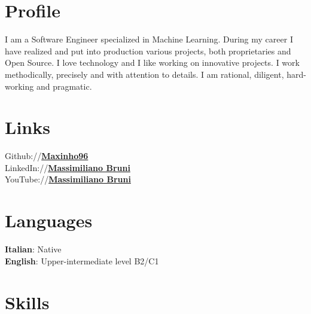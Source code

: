 \documentclass[]{deedy-resume-openfont}
\begin{document}
\begin{minipage}[t]{0.33\textwidth} 


\section{Profile}
I am a Software Engineer specialized in Machine Learning. During my career I have realized and put into production various projects, both proprietaries and Open Source. I love technology and I like working on innovative projects. I work methodically, precisely and with attention to details. I am rational, diligent, hard-working and pragmatic.


\section{Links} 
Github://\href{https://github.com/Maxinho96}{\bf Maxinho96} \\
LinkedIn://\href{https://www.linkedin.com/in/massimiliano-bruni-352926120}{\bf Massimiliano Bruni} \\
YouTube://\href{https://www.youtube.com/channel/UCqskrALDsaUvYC8ztJyqCug}{\bf Massimiliano Bruni}
\sectionsep


\section{Languages}
\textbf{Italian}: Native \\
\textbf{English}: Upper-intermediate level B2/C1
\sectionsep


\section{Skills}


\end{minipage}
\end{document}
